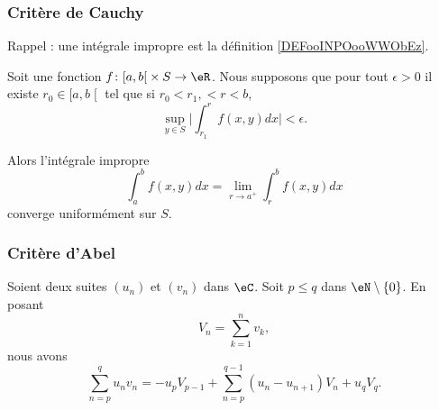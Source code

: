 \subsubsection{Critère de Cauchy}

Rappel : une intégrale impropre est la définition \ref{DEFooINPOooWWObEz}.

\begin{proposition}	\label{PROPooQDLZooYRABia}
	Soit une fonction \(f \colon \mathopen[ a,b\mathclose[\times S\to \eR  \). Nous supposons que pour tout \( \epsilon>0\) il existe \( r_0\in \mathopen[ a,b\mathclose[\) tel que si \( r_0<r_1,<r<b\),
	\begin{equation}
		\sup_{y\in S}\big| \int_{r_1}^rf(x,y)dx \big| <\epsilon.
	\end{equation}

	Alors l'intégrale impropre
	\begin{equation}
		\int_a^bf(x,y)dx=\lim_{r\to a^+}\int_r^bf(x,y)dx
	\end{equation}
	converge uniformément sur \( S\).
\end{proposition}



\subsubsection{Critère d'Abel}


\begin{lemma}	\label{LEMooZBARooCFlMyM}
	Soient deux suites \( (u_n)\) et \( (v_n)\) dans \( \eC\). Soit \( p\leq q\) dans \( \eN\setminus\{ 0 \}\). En posant
	\begin{equation}
		V_n=\sum_{k=1}^nv_k,
	\end{equation}
	nous avons
	\begin{equation}		\label{EQooVCMBooOiwCVi}
		\sum_{n=p}^qu_nv_n=-u_pV_{p-1}+\sum_{n=p}^{q-1}(u_n-u_{n+1})V_n+u_qV_q.
	\end{equation}
\end{lemma}

